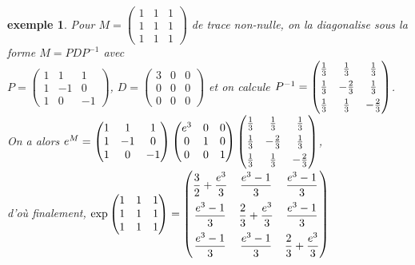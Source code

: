 \documentclass[a4paper]{article}
\newtheorem*{example}{exemple}
\begin{document}
\begin{example}
    Pour $M = \begin{pmatrix} 1 & 1 & 1 \\ 1 & 1 & 1 \\ 1 & 1 & 1 \end{pmatrix}$ de trace non-nulle, on la diagonalise sous la forme $M = PDP^{-1}$ avec \\$P = \begin{pmatrix} 1 & 1 & 1 \\ 1 & -1 & 0 \\ 1 & 0 & -1 \end{pmatrix}$, $D = \begin{pmatrix} 3 & 0 & 0 \\ 0 & 0 & 0 \\ 0 & 0 & 0 \end{pmatrix}$ et on calcule $\setlength{\delimitershortfall}{0pt} P^{-1} =  \begin{pmatrix} \frac{1}{3} & \frac{1}{3} & \frac{1}{3} \\[1ex] \frac{1}{3} & -\frac{2}{3} & \frac{1}{3} \\[1ex] \frac{1}{3} & \frac{1}{3} & -\frac{2}{3} \end{pmatrix}$.\\On a alors $e^M = \begin{pmatrix} 1 & 1 & 1 \\ 1 & -1 & 0 \\ 1 & 0 & -1 \end{pmatrix} \begin{pmatrix} e^3 & 0 & 0 \\ 0 & 1 & 0 \\ 0 & 0 & 1 \end{pmatrix}\setlength{\delimitershortfall}{0pt} \begin{pmatrix} \frac{1}{3} & \frac{1}{3} & \frac{1}{3} \\[1ex] \frac{1}{3} & -\frac{2}{3} & \frac{1}{3} \\[1ex] \frac{1}{3} & \frac{1}{3} & -\frac{2}{3} \end{pmatrix}$, \\d'où finalement, $\exp\begin{pmatrix} 1 & 1 & 1 \\ 1 & 1 & 1 \\ 1 & 1 & 1 \end{pmatrix} = \setlength{\delimitershortfall}{0pt} \begin{pmatrix} \dfrac{3}{2} + \dfrac{e^3}{3} & \dfrac{e^3-1}{3} & \dfrac{e^3-1}{3} \\[2ex] \dfrac{e^3-1}{3} & \dfrac{2}{3} + \dfrac{e^3}{3} & \dfrac{e^3-1}{3} \\[2ex] \dfrac{e^3-1}{3} & \dfrac{e^3-1}{3} & \dfrac{2}{3} + \dfrac{e^3}{3} \end{pmatrix}$
    
\end{example}
\end{document}
